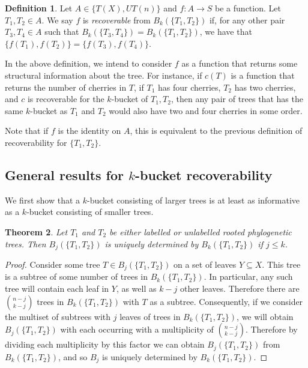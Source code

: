 \documentclass[12pt]{article}
\newtheorem{Theorem}{Theorem}[section]
\theoremstyle{definition}
\newtheorem{Definition}[Theorem]{Definition}
\begin{document}
\begin{Definition}
    Let $A \in \{T(X),UT(n)\}$ and $f: A \rightarrow S$ be a function. Let $T_1, T_2 \in A$. We say $f$ is \emph{recoverable} from $B_k(\{T_1,T_2\})$ if, for any other pair $T_3,T_4 \in A$ such that $B_k(\{T_3,T_4\})=B_k(\{T_1,T_2\})$, we have that $\{f(T_1),f(T_2)\}= \{f(T_3),f(T_4)\}$.  
\end{Definition}

In the above definition, we intend to consider $f$ as a function that returns some structural information about the tree. For instance, if $c(T)$ is a function that returns the number of cherries in $T$, if $T_1$ has four cherries, $T_2$ has two cherries, and $c$ is recoverable for the $k$-bucket of $T_1,T_2$, then any pair of trees that has the same $k$-bucket as $T_1$ and $T_2$ would also have two and four cherries in some order.

Note that if $f$ is the identity on $A$, this is equivalent to the previous definition of recoverability for $\{T_1,T_2\}$. 

\subsection{General results for \texorpdfstring{$k$}{k}-bucket recoverability}

We first show that a $k$-bucket consisting of larger trees is at least as informative as a $k$-bucket consisting of smaller trees.

\begin{Theorem}\label{smaller_bucket_from_larger}
    Let $T_1$ and $T_2$ be either labelled or unlabelled rooted phylogenetic trees. Then $B_j(\{T_1,T_2\})$ is uniquely determined by $B_k(\{T_1,T_2\})$ if $j \leq k$.
\end{Theorem}

\begin{proof}
    Consider some tree $T \in B_j(\{T_1,T_2\})$ on a set of leaves $Y \subseteq X$. This tree is a subtree of some number of trees in $B_k(\{T_1,T_2\})$. In particular, any such tree will contain each leaf in $Y$, as well as $k-j$ other leaves. Therefore there are $\binom{n-j}{k-j}$ trees in $B_k(\{T_1,T_2\})$ with $T$ as a subtree. Consequently, if we consider the multiset of subtrees with $j$ leaves of trees in $B_k(\{T_1,T_2\})$, we will obtain $B_j(\{T_1,T_2\})$ with each occurring with a multiplicity of $\binom{n-j}{k-j}$. Therefore by dividing each multiplicity by this factor we can obtain $B_j(\{T_1,T_2\})$ from $B_k(\{T_1,T_2\})$, and so $B_j$ is uniquely determined by $B_k(\{T_1,T_2\})$.
\end{proof}
\end{document}
